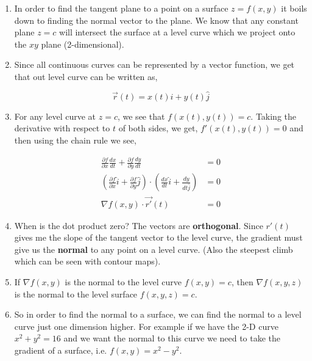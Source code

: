 \documentclass[11pt]{article}
\begin{document}
\begin{enumerate}
\item In order to find the tangent plane to a point on a surface $z = f(x,y)$ it boils down to finding the normal vector to the plane. We know that any constant plane $z= c$ will intersect the surface at a level curve which we project onto the $xy$ plane (2-dimensional).

\item Since all continuous curves can be represented by a vector function, we get that out level curve can be written as,

\begin{equation*}
    \vec{r}(t) = x(t)\hat{i} + y(t) \hat{j}
\end{equation*}

\item For any level curve at $z=c$, we see that $f(x(t),y(t)) = c$. Taking the derivative with respect to $t$ of both sides, we get, $f'(x(t),y(t)) = 0$ and then using the chain rule we see,

\begin{align*}
    \frac{\partial f}{\partial x}\frac{dx}{dt} + \frac{\partial f}{\partial y}\frac{dy}{dt} &= 0 \\
   \left( \frac{\partial f}{\partial x} \hat{i} + \frac{\partial f}{\partial y} \hat{j}\right) \cdot \left(\frac{dx}{dt}\hat{i} + \frac{dy}{dt \hat{j}}\right) &= 0\\
   \nabla f(x,y) \cdot \vec{r'}(t) &=0
\end{align*}

\item When is the dot product zero? The vectors are \textbf{orthogonal}. Since $r'(t)$ gives me the slope of the tangent vector to the level curve, the gradient must give us the \textbf{normal} to any point on a level curve. (Also the steepest climb which can be seen with contour maps).

\item If $\nabla f(x,y)$ is the normal to the level curve $f(x,y) = c$, then $\nabla f(x,y,z)$ is the normal to the level surface $f(x,y,z)=c$.

\item So in order to find the normal to a surface, we can find the normal to a level curve just one dimension higher. For example if we have the 2-D curve $x^2+y^2 = 16$ and we want the normal to this curve we need to take the gradient of a surface, i.e. $f(x,y) = x^2-y^2$.



\end{enumerate}
\end{document}
